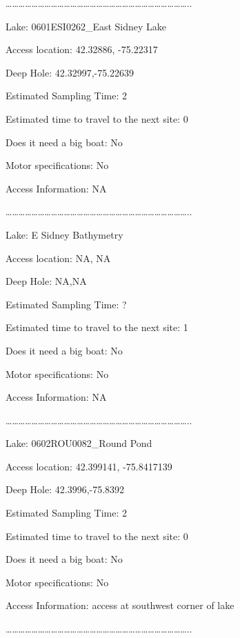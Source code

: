 \documentclass[]{article}
\begin{document}
\ldots{}\ldots{}\ldots{}\ldots{}\ldots{}\ldots{}\ldots{}\ldots{}\ldots{}\ldots{}\ldots{}\ldots{}\ldots{}\ldots{}\ldots{}\ldots{}\ldots{}\ldots{}\ldots{}\ldots{}\ldots{}\ldots{}\ldots{}\ldots{}\ldots{}\ldots{}\ldots{}\ldots{}..

Lake: 0601ESI0262\_East Sidney Lake

Access location: 42.32886, -75.22317

Deep Hole: 42.32997,-75.22639

Estimated Sampling Time: 2

Estimated time to travel to the next site: 0

Does it need a big boat: No

Motor specifications: No

Access Information: NA

\ldots{}\ldots{}\ldots{}\ldots{}\ldots{}\ldots{}\ldots{}\ldots{}\ldots{}\ldots{}\ldots{}\ldots{}\ldots{}\ldots{}\ldots{}\ldots{}\ldots{}\ldots{}\ldots{}\ldots{}\ldots{}\ldots{}\ldots{}\ldots{}\ldots{}\ldots{}\ldots{}\ldots{}..

Lake: E Sidney Bathymetry

Access location: NA, NA

Deep Hole: NA,NA

Estimated Sampling Time: ?

Estimated time to travel to the next site: 1

Does it need a big boat: No

Motor specifications: No

Access Information: NA

\ldots{}\ldots{}\ldots{}\ldots{}\ldots{}\ldots{}\ldots{}\ldots{}\ldots{}\ldots{}\ldots{}\ldots{}\ldots{}\ldots{}\ldots{}\ldots{}\ldots{}\ldots{}\ldots{}\ldots{}\ldots{}\ldots{}\ldots{}\ldots{}\ldots{}\ldots{}\ldots{}\ldots{}..

Lake: 0602ROU0082\_Round Pond

Access location: 42.399141, -75.8417139

Deep Hole: 42.3996,-75.8392

Estimated Sampling Time: 2

Estimated time to travel to the next site: 0

Does it need a big boat: No

Motor specifications: No

Access Information: access at southwest corner of lake

\ldots{}\ldots{}\ldots{}\ldots{}\ldots{}\ldots{}\ldots{}\ldots{}\ldots{}\ldots{}\ldots{}\ldots{}\ldots{}\ldots{}\ldots{}\ldots{}\ldots{}\ldots{}\ldots{}\ldots{}\ldots{}\ldots{}\ldots{}\ldots{}\ldots{}\ldots{}\ldots{}\ldots{}..
\end{document}
